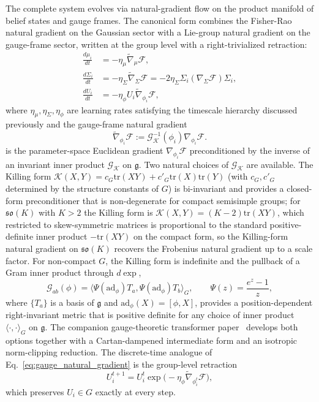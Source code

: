 \documentclass[11pt]{article}
\begin{document}
The complete system evolves via natural-gradient flow on the product manifold of belief states and gauge frames. The canonical form combines the Fisher-Rao natural gradient on the Gaussian sector with a Lie-group natural gradient on the gauge-frame sector, written at the group level with a right-trivialized retraction:
\begin{align}
\frac{d\mu_i}{dt} &= -\eta_\mu \tilde{\nabla}_\mu \mathcal{F}, \\
\frac{d\Sigma_i}{dt} &= -\eta_\Sigma \tilde{\nabla}_\Sigma \mathcal{F} = -2\eta_\Sigma \Sigma_i (\nabla_\Sigma \mathcal{F}) \Sigma_i, \\
\frac{dU_i}{dt} &= -\eta_\phi U_i \tilde{\nabla}_{\phi_i} \mathcal{F},
\label{eq:gauge_natural_gradient}
\end{align}
where $\eta_\mu, \eta_\Sigma, \eta_\phi$ are learning rates satisfying the timescale hierarchy discussed previously and the gauge-frame natural gradient
\begin{equation}
\tilde{\nabla}_{\phi_i} \mathcal{F} := \mathcal{G}_{\mathcal{K}}^{-1}(\phi_i) \nabla_{\phi_i} \mathcal{F}.
\label{eq:gauge_natural_gradient_def}
\end{equation}
is the parameter-space Euclidean gradient $\nabla_{\phi_i}\mathcal{F}$ preconditioned by the inverse of an invariant inner product $\mathcal{G}_{\mathcal{K}}$ on $\mathfrak{g}$. Two natural choices of $\mathcal{G}_{\mathcal{K}}$ are available. The Killing form $\mathcal{K}(X,Y) = c_G \mathrm{tr}(XY) + c'_G \mathrm{tr}(X)\mathrm{tr}(Y)$ (with $c_G, c'_G$ determined by the structure constants of $G$) is bi-invariant and provides a closed-form preconditioner that is non-degenerate for compact semisimple groups; for $\mathfrak{so}(K)$ with $K > 2$ the Killing form is $\mathcal{K}(X,Y) = (K-2)\mathrm{tr}(XY)$, which restricted to skew-symmetric matrices is proportional to the standard positive-definite inner product $-\mathrm{tr}(XY)$ on the compact form, so the Killing-form natural gradient on $\mathfrak{so}(K)$ recovers the Frobenius natural gradient up to a scale factor. For non-compact $G$, the Killing form is indefinite and the pullback of a Gram inner product through $d\exp$,
\begin{equation}
\mathcal{G}_{ab}(\phi) = \langle \Psi(\mathrm{ad}_\phi)T_a, \Psi(\mathrm{ad}_\phi)T_b \rangle_G,
\qquad
\Psi(z) = \frac{e^z - 1}{z},
\label{eq:pullback_metric}
\end{equation}
where $\{T_a\}$ is a basis of $\mathfrak{g}$ and $\mathrm{ad}_\phi(X) = [\phi, X]$, provides a position-dependent right-invariant metric that is positive definite for any choice of inner product $\langle\cdot,\cdot\rangle_G$ on $\mathfrak{g}$. The companion gauge-theoretic transformer paper~\cite{Dennis2025trans} develops both options together with a Cartan-dampened intermediate form and an isotropic norm-clipping reduction. The discrete-time analogue of Eq.~\eqref{eq:gauge_natural_gradient} is the group-level retraction
\begin{equation}
U_i^{t+1} = U_i^t \exp\big(-\eta_\phi \tilde{\nabla}_{\phi_i^t} \mathcal{F}\big),
\label{eq:gauge_group_retraction}
\end{equation}
which preserves $U_i \in G$ exactly at every step.
\end{document}

